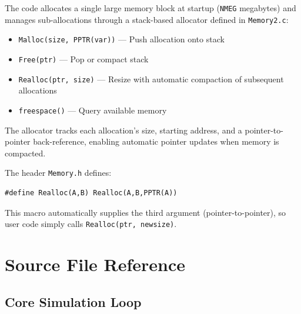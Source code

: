 \documentclass[11pt,fleqn]{book}
\newcommand{\code}[1]{\texttt{#1}}
\newcommand{\file}[1]{\texttt{#1}}
\begin{document}
\begin{definition}
The code allocates a single large memory block at startup (\code{NMEG} megabytes) and manages sub-allocations through a stack-based allocator defined in \file{Memory2.c}:
\begin{itemize}[leftmargin=2em]
  \item \code{Malloc(size, PPTR(var))} --- Push allocation onto stack
  \item \code{Free(ptr)} --- Pop or compact stack
  \item \code{Realloc(ptr, size)} --- Resize with automatic compaction of subsequent allocations
  \item \code{freespace()} --- Query available memory
\end{itemize}
The allocator tracks each allocation's size, starting address, and a pointer-to-pointer back-reference, enabling automatic pointer updates when memory is compacted.
\end{definition}

\begin{remark}
The header \file{Memory.h} defines:
\begin{lstlisting}[style=ccode,numbers=none]
#define Realloc(A,B) Realloc(A,B,PPTR(A))
\end{lstlisting}
This macro automatically supplies the third argument (pointer-to-pointer), so user code simply calls \code{Realloc(ptr, newsize)}.
\end{remark}


\chapter{Source File Reference}
\label{ch:sourcefiles}

\section{Core Simulation Loop}
\end{document}
